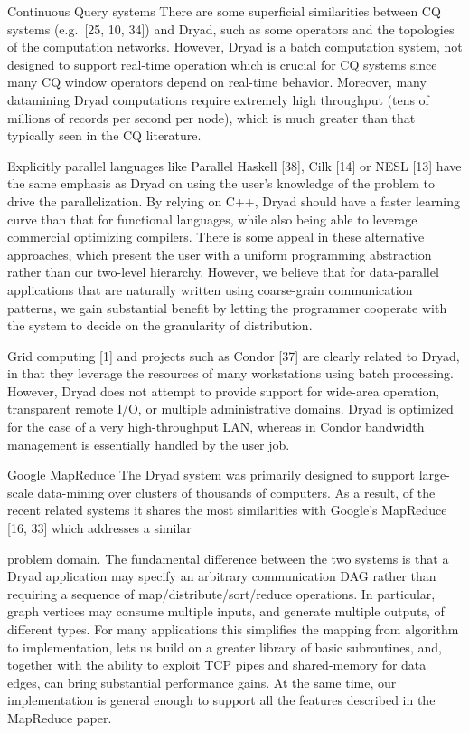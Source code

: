 \documentclass[
]{article}
\begin{document}
Continuous Query systems There are some superficial similarities between
CQ systems (e.g.~{[}25, 10, 34{]}) and Dryad, such as some operators and
the topologies of the computation networks. However, Dryad is a batch
computation system, not designed to support real-time operation which is
crucial for CQ systems since many CQ window operators depend on
real-time behavior. Moreover, many datamining Dryad computations require
extremely high throughput (tens of millions of records per second per
node), which is much greater than that typically seen in the CQ
literature.

Explicitly parallel languages like Parallel Haskell {[}38{]}, Cilk
{[}14{]} or NESL {[}13{]} have the same emphasis as Dryad on using the
user's knowledge of the problem to drive the parallelization. By relying
on C++, Dryad should have a faster learning curve than that for
functional languages, while also being able to leverage commercial
optimizing compilers. There is some appeal in these alternative
approaches, which present the user with a uniform programming
abstraction rather than our two-level hierarchy. However, we believe
that for data-parallel applications that are naturally written using
coarse-grain communication patterns, we gain substantial benefit by
letting the programmer cooperate with the system to decide on the
granularity of distribution.

Grid computing {[}1{]} and projects such as Condor {[}37{]} are clearly
related to Dryad, in that they leverage the resources of many
workstations using batch processing. However, Dryad does not attempt to
provide support for wide-area operation, transparent remote I/O, or
multiple administrative domains. Dryad is optimized for the case of a
very high-throughput LAN, whereas in Condor bandwidth management is
essentially handled by the user job.

Google MapReduce The Dryad system was primarily designed to support
large-scale data-mining over clusters of thousands of computers. As a
result, of the recent related systems it shares the most similarities
with Google's MapReduce {[}16, 33{]} which addresses a similar

problem domain. The fundamental difference between the two systems is
that a Dryad application may specify an arbitrary communication DAG
rather than requiring a sequence of map/distribute/sort/reduce
operations. In particular, graph vertices may consume multiple inputs,
and generate multiple outputs, of different types. For many applications
this simplifies the mapping from algorithm to implementation, lets us
build on a greater library of basic subroutines, and, together with the
ability to exploit TCP pipes and shared-memory for data edges, can bring
substantial performance gains. At the same time, our implementation is
general enough to support all the features described in the MapReduce
paper.
\end{document}
